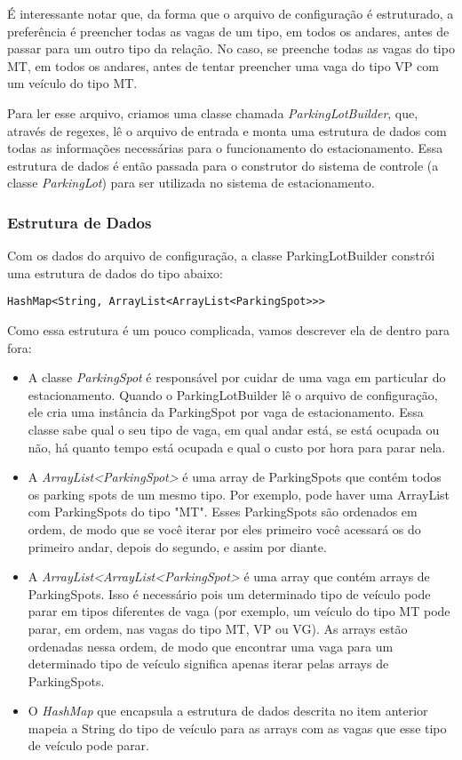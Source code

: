 \documentclass{article}
\begin{document}
É interessante notar que, da forma que o arquivo de configuração é estruturado, a preferência é preencher todas as vagas de um tipo, em todos os andares, antes de passar para um outro tipo da relação. No caso, se preenche todas as vagas do tipo MT, em todos os andares, antes de tentar preencher uma vaga do tipo VP com um veículo do tipo MT.

Para ler esse arquivo, criamos uma classe chamada \emph{ParkingLotBuilder}, que, através de regexes, lê o arquivo de entrada e monta uma estrutura de dados com todas as informações necessárias para o funcionamento do estacionamento. Essa estrutura de dados é então passada para o construtor do sistema de controle (a classe \emph{ParkingLot}) para ser utilizada no sistema de estacionamento.

\subsubsection{Estrutura de Dados}

Com os dados do arquivo de configuração, a classe ParkingLotBuilder constrói uma estrutura de dados do tipo abaixo:

\begin{lstlisting}
HashMap<String, ArrayList<ArrayList<ParkingSpot>>>
\end{lstlisting}

Como essa estrutura é um pouco complicada, vamos descrever ela de dentro para fora:

\begin{itemize}
    \item A classe \emph{ParkingSpot} é responsável por cuidar de uma vaga em particular do estacionamento. Quando o ParkingLotBuilder lê o arquivo de configuração, ele cria uma instância da ParkingSpot por vaga de estacionamento. Essa classe sabe qual o seu tipo de vaga, em qual andar está, se está ocupada ou não, há quanto tempo está ocupada e qual o custo por hora para parar nela.
    \item A \emph{ArrayList<ParkingSpot>} é uma array de ParkingSpots que contém todos os parking spots de um mesmo tipo. Por exemplo, pode haver uma ArrayList com ParkingSpots do tipo "MT". Esses ParkingSpots são ordenados em ordem, de modo que se você iterar por eles primeiro você acessará os do primeiro andar, depois do segundo, e assim por diante.
    \item A \emph{ArrayList<ArrayList<ParkingSpot>} é uma array que contém arrays de ParkingSpots. Isso é necessário pois um determinado tipo de veículo pode parar em tipos diferentes de vaga (por exemplo, um veículo do tipo MT pode parar, em ordem, nas vagas do tipo MT, VP ou VG). As arrays estão ordenadas nessa ordem, de modo que encontrar uma vaga para um determinado tipo de veículo significa apenas iterar pelas arrays de ParkingSpots.
    \item O \emph{HashMap} que encapsula a estrutura de dados descrita no item anterior mapeia a String do tipo de veículo para as arrays com as vagas que esse tipo de veículo pode parar.
\end{itemize}
\end{document}
